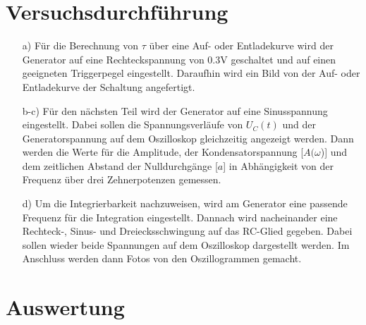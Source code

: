 \section{Versuchsdurchführung}\justifying

\begin{enumerate}
\item[a)] Für die Berechnung von $\tau$ über eine Auf- oder Entladekurve wird der 
          Generator auf eine Rechteckspannung von 0.3V geschaltet und auf einen geeigneten 
          Triggerpegel eingestellt. Daraufhin wird ein Bild von der Auf- 
          oder Entladekurve der Schaltung angefertigt.\\
\item[b-c)] Für den nächsten Teil wird der Generator auf eine Sinusspannung 
          eingestellt. Dabei sollen die Spannungsverläufe von $U_C(t)$ und der 
          Generatorspannung auf dem Oszilloskop gleichzeitig angezeigt werden. 
          Dann werden die Werte für die Amplitude, der Kondensatorspannung 
          [$A(\omega$)] und dem zeitlichen Abstand der Nulldurchgänge 
          [$a$] in Abhängigkeit von der Frequenz über drei Zehnerpotenzen gemessen.\\
\item[d)] Um die Integrierbarkeit nachzuweisen, wird am Generator eine passende 
          Frequenz für die Integration eingestellt. Dannach wird nacheinander eine 
          Rechteck-, Sinus- und Dreiecksschwingung auf das RC-Glied gegeben. 
          Dabei sollen wieder beide Spannungen auf dem Oszilloskop dargestellt 
          werden. Im Anschluss werden dann Fotos von den Oszillogrammen gemacht.
\end{enumerate}

\section{Auswertung}\justifying

  
